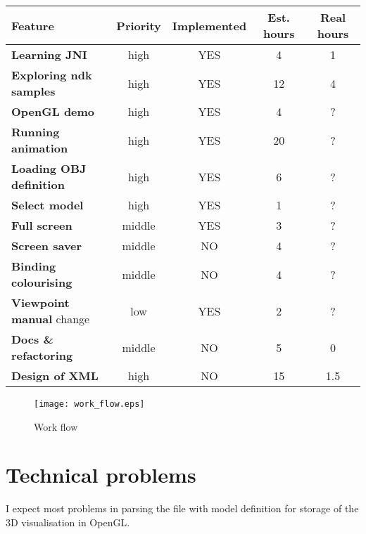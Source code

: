 \begin{tabular}{| l || c | c |  c | c |}
\hline
Feature & Priority & Implemented & Est. hours & Real hours\\
\hline
\textbf{Learning JNI} & high & YES & 4 & 1\\
\textbf{Exploring ndk samples} & high & YES & 12 & 4\\
\textbf{OpenGL demo} & high & YES & 4 & ?\\
\textbf{Running animation} & high & YES & 20 & ?\\
\textbf{Loading OBJ definition} & high & YES & 6 & ?\\
\textbf{Select model} & high & YES & 1 & ?\\
\textbf{Full screen} & middle & YES & 3 & ?\\
\textbf{Screen saver} & middle & NO & 4 & ?\\
\textbf{Binding colourising} & middle & NO & 4 & ?\\
\textbf{Viewpoint manual} change & low & YES & 2 & ?\\
\textbf{Docs \& refactoring} & middle & NO & 5 & 0\\
\textbf{Design of XML} & high & NO & 15 & 1.5\\
\hline
\end{tabular}
\begin{figure}
\texttt{[image: work\_flow.eps]}
\label{work_flow}
\caption{Work flow}
\end{figure}


\section*{Technical problems} %
\label{sec:Technical problems}
I expect most problems in parsing the file with model definition
for storage of the 3D visualisation in OpenGL.

